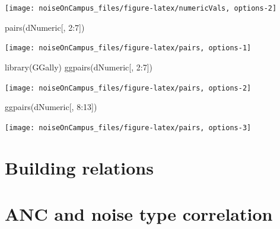 \documentclass[
]{article}
\newenvironment{Shaded}{\begin{snugshade}}{\end{snugshade}}
\newcommand{\DecValTok}[1]{\textcolor[rgb]{0.00,0.00,0.81}{#1}}
\newcommand{\FunctionTok}[1]{\textcolor[rgb]{0.00,0.00,0.00}{#1}}
\newcommand{\NormalTok}[1]{#1}
\newcommand{\SpecialCharTok}[1]{\textcolor[rgb]{0.00,0.00,0.00}{#1}}
\begin{document}
\begin{center}\texttt{[image: noiseOnCampus\_files/figure-latex/numericVals, options-2]} \end{center}

\begin{Shaded}
\begin{Highlighting}[]
\FunctionTok{pairs}\NormalTok{(dNumeric[, }\DecValTok{2}\SpecialCharTok{:}\DecValTok{7}\NormalTok{])}
\end{Highlighting}
\end{Shaded}

\begin{center}\texttt{[image: noiseOnCampus\_files/figure-latex/pairs, options-1]} \end{center}

\begin{Shaded}
\begin{Highlighting}[]
\FunctionTok{library}\NormalTok{(GGally)}
\FunctionTok{ggpairs}\NormalTok{(dNumeric[, }\DecValTok{2}\SpecialCharTok{:}\DecValTok{7}\NormalTok{])}
\end{Highlighting}
\end{Shaded}

\begin{center}\texttt{[image: noiseOnCampus\_files/figure-latex/pairs, options-2]} \end{center}

\begin{Shaded}
\begin{Highlighting}[]
\FunctionTok{ggpairs}\NormalTok{(dNumeric[, }\DecValTok{8}\SpecialCharTok{:}\DecValTok{13}\NormalTok{])}
\end{Highlighting}
\end{Shaded}

\begin{center}\texttt{[image: noiseOnCampus\_files/figure-latex/pairs, options-3]} \end{center}

\hypertarget{building-relations}{%
\section{Building relations}\label{building-relations}}

\hypertarget{anc-and-noise-type-correlation}{%
\section{ANC and noise type correlation}\label{anc-and-noise-type-correlation}}
\end{document}
